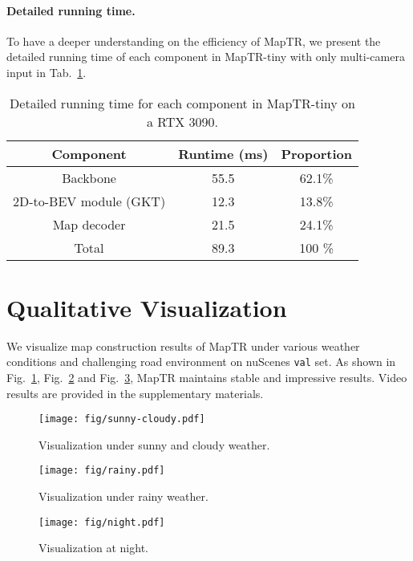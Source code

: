 \documentclass{article} \usepackage{iclr2023_conference,times}
\begin{document}
\paragraph{Detailed running time.} To have a deeper understanding on the efficiency of MapTR, we present the detailed running time of each component in MapTR-tiny with only multi-camera input in Tab.~\ref{tab:runtime}.

\begin{table}[ht!]
\begin{center}
\begin{tabular}{ccc}
\hline
\rowcolor{Gray}
Component & Runtime (ms) & Proportion \\
\toprule
Backbone & 55.5 & 62.1\%\\
2D-to-BEV module (GKT) & 12.3 & 13.8\%\\
Map decoder & 21.5 & 24.1\% \\
\hline
Total& 89.3 & 100 \%\\
\bottomrule
\end{tabular}
\end{center}
\vspace*{-0.45cm}
\caption{Detailed running time for each component in MapTR-tiny on a RTX 3090.}
\label{tab:runtime}
\vspace*{-0.35cm}
\end{table}
\section{Qualitative Visualization}
\label{sec:more_vis}
We visualize map construction results of MapTR under various weather conditions and challenging road environment on nuScenes \texttt{val} set. As shown in Fig.~\ref{fig:sunny-cloudy}, Fig.~\ref{fig:rainy} and Fig.~\ref{fig:night}, MapTR maintains stable and impressive results. Video results are provided in the supplementary materials.

\begin{figure}[t!]
    \begin{center}
    \texttt{[image: fig/sunny-cloudy.pdf]}
    \end{center}
    \vspace*{-0.3cm}
    \caption{Visualization under sunny and cloudy weather.}
    \label{fig:sunny-cloudy}
\end{figure}

\begin{figure}[t!]
    \begin{center}
    \texttt{[image: fig/rainy.pdf]}
    \end{center}
    \vspace*{-0.3cm}
    \caption{Visualization under rainy weather.}
    \label{fig:rainy}
\end{figure}

\begin{figure}[t!]
    \begin{center}
    \texttt{[image: fig/night.pdf]}
    \end{center}
    \vspace*{-0.3cm}
    \caption{Visualization at night.}
    \label{fig:night}
\end{figure}
\end{document}
